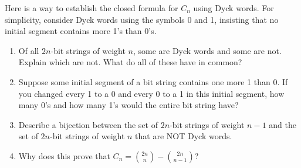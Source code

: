 \documentclass{book}
\begin{document}
\setcounter{project}{186}
\addtocounter{project}{-1}
\begin{activity}[]\label{activity-179}
\hypertarget{p-1083}{}%
Here is a way to establish the closed formula for \(C_n\) using Dyck words.  For simplicity, consider Dyck words using the symbols 0 and 1, insisting that no initial segment contains more 1's than 0's.%
\begin{enumerate}[font=\bfseries,label=(\alph*),ref=\alph*]
\item\label{task-200} \hypertarget{p-1084}{}%
Of all \(2n\)-bit strings of weight \(n\), some are Dyck words and some are not.  Explain which are not.  What do all of these have in common?%
\item\label{task-201} \hypertarget{p-1085}{}%
Suppose some initial segment of a bit string contains one more 1 than 0.  If you changed every 1 to a 0 and every 0 to a 1 in this initial segment, how many 0's and how many 1's would the entire bit string have?%
\item\label{task-202} \hypertarget{p-1086}{}%
Describe a bijection between the set of \(2n\)-bit strings of weight \(n-1\) and the set of \(2n\)-bit strings of weight \(n\) that are NOT Dyck words.%
\item\label{task-203} \hypertarget{p-1087}{}%
Why does this prove that \(C_n = \binom{2n}{n} - \binom{2n}{n-1}\)?%
\end{enumerate}
\end{activity}
\end{document}
